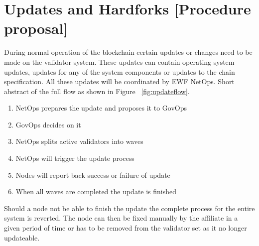 \section{Updates and Hardforks [Procedure proposal]}

During normal operation of the blockchain certain updates or changes need to be made on the validator system. These updates can contain operating system updates, updates for any of the system components or updates to the chain specification. All these updates will be coordinated by EWF NetOps.
Short abstract of the full flow as shown in Figure ~\ref{fig:updateflow}.

\begin{enumerate}
    \item NetOps prepares the update and proposes it to GovOps
    \item GovOps decides on it
    \item NetOps splits active validators into waves
    \item NetOps will trigger the update process
    \item Nodes will report back success or failure of update
    \item When all waves are completed the update is finished
\end{enumerate}

Should a node not be able to finish the update the complete process for the entire system is reverted. The node can then be fixed manually by the affiliate in a given period of time or has to be removed from the validator set as it no longer updateable.

